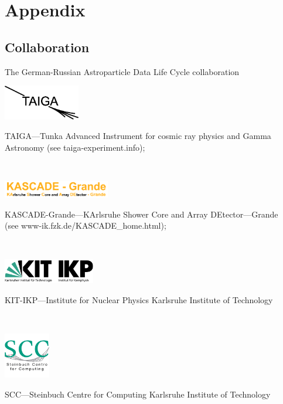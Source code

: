 
\appendix
\beginbackup
\section{Appendix}
\subsection{Collaboration}
\begin{frame}[allowframebreaks]
{The German-Russian Astroparticle Data Life Cycle collaboration}
\parbox{0.35\textwidth}{
  \centering\includegraphics[width=0.25\textwidth]{pics/taiga.eps}
}\hfill
\parbox{0.60\textwidth}{
  TAIGA---Tunka Advanced Instrument for cosmic ray physics and Gamma Astronomy (see
  taiga-experiment.info);
}
\\\vspace{1em}
\parbox{0.35\textwidth}{
  \centering\includegraphics[width=0.35\textwidth]{pics/grande.pdf}
}\hfill
\parbox{0.60\textwidth}{
  KASCADE-Grande---KArlsruhe Shower Core and Array DEtector---Grande\\ (see
  www-ik.fzk.de/KASCADE\_home.html);
}
\\\vspace{1em}
\parbox{0.35\textwidth}{
  \centering\includegraphics[width=0.30\textwidth]{pics/Logo_KIT_IKP.pdf}
}\hfill
\parbox{0.60\textwidth}{
  KIT-IKP---Institute for Nuclear Physics Karlsruhe Institute of Technology
}
\\\vspace{1em}
\parbox{0.35\textwidth}{
  \centering\includegraphics[width=0.15\textwidth]{pics/SCC-Logo.png}
}\hfill
\parbox{0.60\textwidth}{
  SCC---Steinbuch Centre for Computing Karlsruhe Institute of Technology
}
\end{frame}

